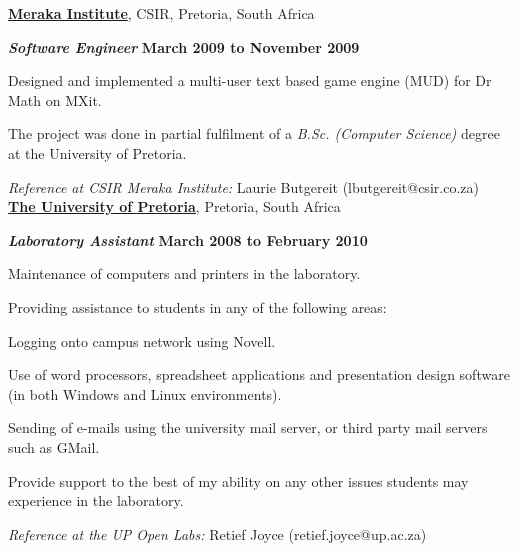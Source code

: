 \documentclass[10pt]{article}
\newenvironment{outerlist}[1][\enskip\textbullet]%
        {\begin{itemize}[#1]}{\end{itemize}%
         \vspace{-.6\baselineskip}}
\newenvironment{innerlist}[1][\enskip\textbullet]%
        {\begin{compactitem}[#1]}{\end{compactitem}}
\newenvironment{innerinnerlist}[1][\enskip$\circ$]%
        {\begin{compactitem}[#1]}{\end{compactitem}}
\begin{document}
\href{http://www.meraka.org.za}{\textbf{Meraka Institute}}, CSIR, Pretoria, South Africa
\begin{outerlist}
\item[] \textbf{\textit{Software Engineer}} \hfill \textbf{March 2009 to  November 2009}
        \begin{innerlist}
        \item Designed and implemented a multi-user text based game engine (MUD) for Dr Math on MXit.
        \item The project was done in partial fulfilment of a \textit{B.Sc. (Computer Science)} degree at the University of Pretoria.\\
        \end{innerlist}
\end{outerlist}
\textit{Reference at CSIR Meraka Institute:} \hfill Laurie Butgereit (lbutgereit@csir.co.za) \\

\href{http://www.up.ac.za}{\textbf{The University of Pretoria}}, Pretoria, South Africa
\begin{outerlist}
\item[] \textbf{\textit{Laboratory Assistant}} \hfill \textbf{March 2008 to  February 2010}
        \begin{innerlist}
        \item Maintenance of computers and printers in the laboratory.
        \item Providing assistance to students in any of the following areas:
        \begin{innerinnerlist}
        \item Logging onto campus network using Novell.
        \item Use of word processors, spreadsheet applications and presentation design software (in both Windows and Linux environments).
        \item Sending of e-mails using the university mail server, or third party mail servers such as GMail.
        \item Provide support to the best of my ability on any other issues students may experience in the laboratory. \\
        \end{innerinnerlist}
        \end{innerlist}
\end{outerlist}
\textit{Reference at the UP Open Labs:} \hfill Retief Joyce (retief.joyce@up.ac.za)

\pagebreak
\end{document}
